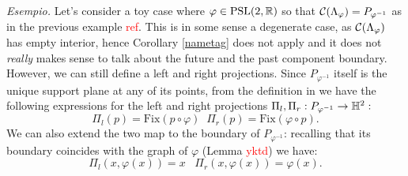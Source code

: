 
\textit{Esempio.} Let's consider a toy case where $\varphi\in\text{PSL}(2,\mathbb{R})$ so that $\mathcal{C}(\Lambda_\varphi)=P_{\varphi^{-1}}$ as in the previous example \textcolor{red}{ref}. This is in some sense a degenerate case, as $\mathcal{C}(\Lambda_\varphi)$ has empty interior, hence Corollary \ref{nametag} does not apply and it does not \textit{really} makes sense to talk about the future and the past component boundary. However, we can still define a left and right projections. Since $P_{\varphi^{-1}}$ itself is the unique support plane at any of its points, from the definition in  we have the following expressions for the left and right projections $\Pi_l,\Pi_r:P_{\varphi^{-1}}\to\mathbb{H}^2:$
\begin{equation}
    \Pi_l(p)=\text{Fix}(p\circ\varphi)\;\;\Pi_r(p)=\text{Fix}(\varphi\circ p).
\end{equation}   
We can also extend the two map to the boundary of $P_{\varphi^{-1}}$: recalling that its boundary coincides with the graph of $\varphi$ (Lemma \textcolor{red}{yktd}) we have: 
\begin{equation}\label{simproj}
    \Pi_l(x,\varphi(x))=x \;\;\;\Pi_r(x,\varphi(x))=\varphi(x). 
\end{equation}

